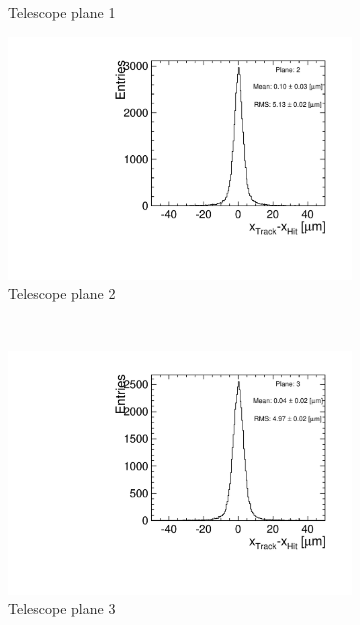 \begin{figure}[htbp]
\begin{subfigure}[b]{0.3\textwidth}
    \caption{Telescope plane 1}
  \end{subfigure}\hfill
  \begin{subfigure}[b]{0.3\textwidth}
    \includegraphics[width=\textwidth]{figures/Telescope/biasedResiduals/BiasedResiduals_run661_PlaneXRMS2.pdf}
    \caption{Telescope plane 2}
  \end{subfigure} \\
  \begin{subfigure}[b]{0.3\textwidth}
    \includegraphics[width=\textwidth]{figures/Telescope/biasedResiduals/BiasedResiduals_run661_PlaneXRMS3.pdf}
    \caption{Telescope plane 3}
  \end{subfigure}\hfill
  \begin{subfigure}[b]{0.3\textwidth}

\end{subfigure}
\end{figure}
